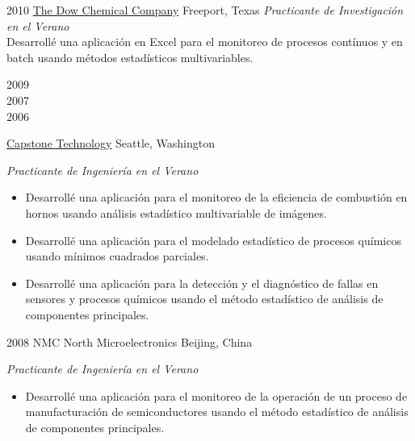 \documentclass[]{friggeri-cv} %
\begin{document}
\begin{entrylist}

\entry
{2010}
{\href{http://www.dow.com/}{The Dow Chemical Company}}
{Freeport, Texas}
{\emph{Practicante de Investigación en el Verano} \\
Desarrollé una aplicación en Excel para el monitoreo de procesos contínuos y en batch usando métodos estadísticos multivariables.}


\entry
{\begin{minipage}[t]{2cm}2009 \\ 2007 \\ 2006\end{minipage}}
{\href{http://www.capstonetechnology.com}{Capstone Technology}}
{Seattle, Washington}
{\emph{Practicante de Ingeniería en el Verano}
\begin{itemize}
	\item Desarrollé una aplicación para el monitoreo de la eficiencia de combustión en hornos usando análisis estadístico multivariable de imágenes.
	\item Desarrollé una aplicación para el modelado estadístico de procesos químicos usando mínimos cuadrados parciales.
	\item Desarrollé una aplicación para la detección y el diagnóstico de fallas en sensores y procesos químicos usando el método estadístico de análisis de componentes principales.
\end{itemize}}


\entry
{2008}
{NMC North Microelectronics}
{Beijing, China}
{\emph{Practicante de Ingeniería en el Verano}
\begin{itemize}
	\item Desarrollé una aplicación para el monitoreo de la operación de un proceso de manufacturación de semiconductores usando el método estadístico de análisis de componentes principales.
\end{itemize}}





\end{entrylist}

\end{document}
